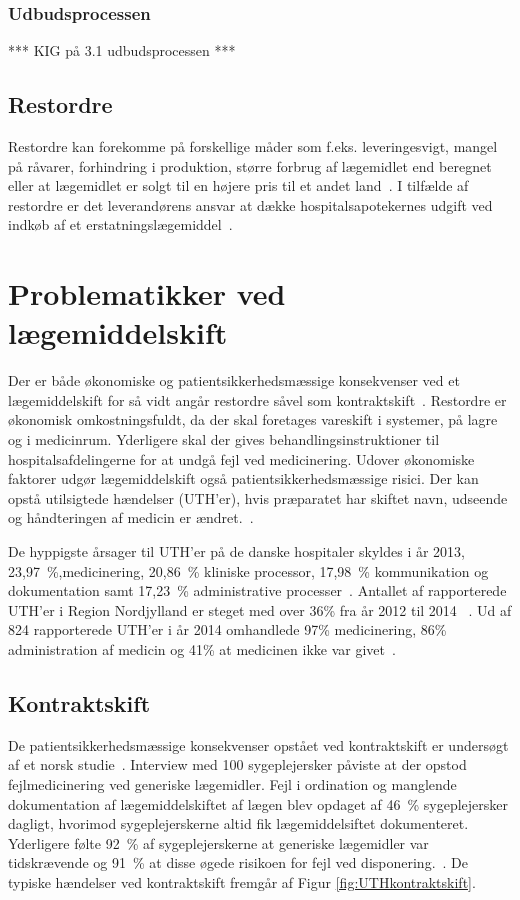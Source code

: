 \subsubsection{Udbudsprocessen}
*** KIG på 3.1 udbudsprocessen  ***

\subsection{Restordre}
Restordre kan forekomme på forskellige måder som f.eks. leveringesvigt, mangel på råvarer, forhindring i produktion, større forbrug af lægemidlet end beregnet eller at lægemidlet er solgt til en højere pris til et andet land~\citep{Amgros2017}. I tilfælde af restordre er det leverandørens ansvar at dække hospitalsapotekernes udgift ved indkøb af et erstatningslægemiddel~.


\section{Problematikker ved lægemiddelskift}
Der er både økonomiske og patientsikkerhedsmæssige konsekvenser ved et lægemiddelskift for så vidt angår restordre såvel som kontraktskift~\citep{Amgros2015}. Restordre er økonomisk omkostningsfuldt, da der skal foretages vareskift i systemer, på lagre og i medicinrum. Yderligere skal der gives behandlingsinstruktioner til hospitalsafdelingerne for at undgå fejl ved medicinering. Udover økonomiske faktorer udgør lægemiddelskift også patientsikkerhedsmæssige risici. Der kan opstå utilsigtede hændelser (UTH'er), hvis præparatet har skiftet navn, udseende og håndteringen af medicin er ændret.~\citep{Amgros2015}. 

De hyppigste årsager til UTH'er på de danske hospitaler skyldes i år 2013, 23,97~\%,medicinering, 20,86~\% kliniske processor, 17,98~\% kommunikation og dokumentation samt 17,23~\% administrative processer~\citep{Patientombuddet2013}. Antallet af rapporterede UTH'er i Region Nordjylland er steget med over 36\% fra år 2012 til 2014 ~\citep{Jensen2014}. Ud af 824 rapporterede UTH'er i år 2014 omhandlede 97\% medicinering, 86\% administration af medicin og 41\% at medicinen ikke var givet~\citep{Jensen2014}. 

\subsection{Kontraktskift}
De patientsikkerhedsmæssige konsekvenser opstået ved kontraktskift er undersøgt af et norsk studie~\citep{Hakonsen2010}. Interview med 100 sygeplejersker påviste at der opstod fejlmedicinering ved generiske lægemidler. Fejl i ordination og manglende dokumentation af lægemiddelskiftet af lægen blev opdaget af 46~\% sygeplejersker dagligt, hvorimod sygeplejerskerne altid fik lægemiddelsiftet dokumenteret. Yderligere følte 92~\% af sygeplejerskerne at generiske lægemidler var tidskrævende og 91~\% at disse øgede risikoen for fejl ved disponering.~\citep{Hakonsen2010}. De typiske hændelser ved kontraktskift fremgår af Figur \ref{fig:UTHkontraktskift}.

